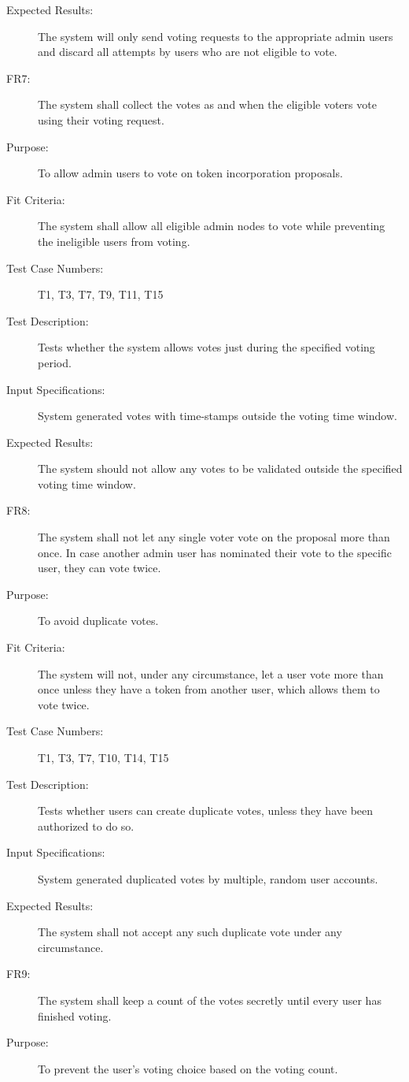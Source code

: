 \documentclass[a4paper,twoside,phd]{BYUPhys}
\begin{document}
\begin{description}
\item[Expected Results:] The system will only send voting requests to the appropriate admin users and discard all attempts by users who are not eligible to vote.
\\
\item[FR7:] The system shall collect the votes as and when the eligible voters vote using their voting request.
\item[Purpose:] To allow admin users to vote on token incorporation proposals.
\item[Fit Criteria:] The system shall allow all eligible admin nodes to vote while preventing the ineligible users from voting.
\item[Test Case Numbers:] T1, T3, T7, T9, T11, T15
\item[Test Description:] Tests whether the system allows votes just during the specified voting period.
\item[Input Specifications:] System generated votes with time-stamps outside the voting time window.
\item[Expected Results:] The system should not allow any votes to be validated outside the specified voting time window.
\\
\item[FR8:] The system shall not let any single voter vote on the proposal more than once. In case another admin user has nominated their vote to the specific user, they can vote twice.
\item[Purpose:] To avoid duplicate votes.
\item[Fit Criteria:] The system will not, under any circumstance, let a user vote more than once unless they have a token from another user, which allows them to vote twice.
\item[Test Case Numbers:] T1, T3, T7, T10, T14, T15
\item[Test Description:] Tests whether users can create duplicate votes, unless they have been authorized to do so.
\item[Input Specifications:] System generated duplicated votes by multiple, random user accounts.
\item[Expected Results:] The system shall not accept any such duplicate vote under any circumstance.
\\
\item[FR9:] The system shall keep a count of the votes secretly until every user has finished voting.
\item[Purpose:] To prevent the user's voting choice based on the voting count.

\end{description}
\end{document}
